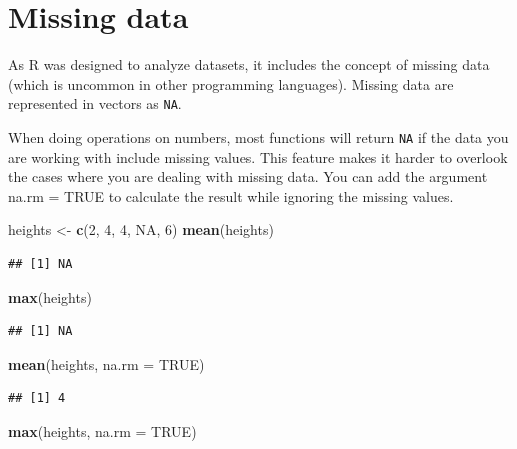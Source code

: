 \documentclass[
]{book}
\newenvironment{Shaded}{\begin{snugshade}}{\end{snugshade}}
\newcommand{\AttributeTok}[1]{\textcolor[rgb]{0.13,0.29,0.53}{#1}}
\newcommand{\ConstantTok}[1]{\textcolor[rgb]{0.56,0.35,0.01}{#1}}
\newcommand{\DecValTok}[1]{\textcolor[rgb]{0.00,0.00,0.81}{#1}}
\newcommand{\FunctionTok}[1]{\textcolor[rgb]{0.13,0.29,0.53}{\textbf{#1}}}
\newcommand{\NormalTok}[1]{#1}
\newcommand{\OtherTok}[1]{\textcolor[rgb]{0.56,0.35,0.01}{#1}}
\begin{document}
\section{Missing data}\label{missing-data}

As R was designed to analyze datasets, it includes the concept of missing data (which is uncommon in other programming languages). Missing data are represented in vectors as \texttt{NA}.

When doing operations on numbers, most functions will return \texttt{NA} if the data you are working with include missing values. This feature makes it harder to overlook the cases where you are dealing with missing data. You can add the argument na.rm = TRUE to calculate the result while ignoring the missing values.

\begin{Shaded}
\begin{Highlighting}[]
\NormalTok{heights }\OtherTok{\textless{}{-}} \FunctionTok{c}\NormalTok{(}\DecValTok{2}\NormalTok{, }\DecValTok{4}\NormalTok{, }\DecValTok{4}\NormalTok{, }\ConstantTok{NA}\NormalTok{, }\DecValTok{6}\NormalTok{)}
\FunctionTok{mean}\NormalTok{(heights)}
\end{Highlighting}
\end{Shaded}

\begin{verbatim}
## [1] NA
\end{verbatim}

\begin{Shaded}
\begin{Highlighting}[]
\FunctionTok{max}\NormalTok{(heights)}
\end{Highlighting}
\end{Shaded}

\begin{verbatim}
## [1] NA
\end{verbatim}

\begin{Shaded}
\begin{Highlighting}[]
\FunctionTok{mean}\NormalTok{(heights, }\AttributeTok{na.rm =} \ConstantTok{TRUE}\NormalTok{)}
\end{Highlighting}
\end{Shaded}

\begin{verbatim}
## [1] 4
\end{verbatim}

\begin{Shaded}
\begin{Highlighting}[]
\FunctionTok{max}\NormalTok{(heights, }\AttributeTok{na.rm =} \ConstantTok{TRUE}\NormalTok{)}
\end{Highlighting}
\end{Shaded}
\end{document}
